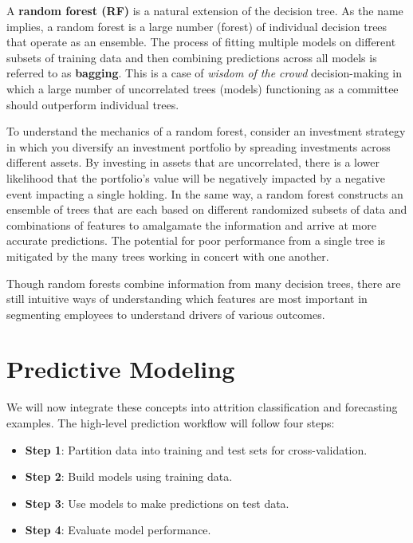 \documentclass[
]{book}
\providecommand{\tightlist}{%
  \setlength{\itemsep}{0pt}\setlength{\parskip}{0pt}}
\begin{document}
A \textbf{random forest (RF)} is a natural extension of the decision tree. As the name implies, a random forest is a large number (forest) of individual decision trees that operate as an ensemble. The process of fitting multiple models on different subsets of training data and then combining predictions across all models is referred to as \textbf{bagging}. This is a case of \emph{wisdom of the crowd} decision-making in which a large number of uncorrelated trees (models) functioning as a committee should outperform individual trees.

To understand the mechanics of a random forest, consider an investment strategy in which you diversify an investment portfolio by spreading investments across different assets. By investing in assets that are uncorrelated, there is a lower likelihood that the portfolio's value will be negatively impacted by a negative event impacting a single holding. In the same way, a random forest constructs an ensemble of trees that are each based on different randomized subsets of data and combinations of features to amalgamate the information and arrive at more accurate predictions. The potential for poor performance from a single tree is mitigated by the many trees working in concert with one another.

Though random forests combine information from many decision trees, there are still intuitive ways of understanding which features are most important in segmenting employees to understand drivers of various outcomes.

\hypertarget{predictive-modeling}{%
\section{Predictive Modeling}\label{predictive-modeling}}

We will now integrate these concepts into attrition classification and forecasting examples. The high-level prediction workflow will follow four steps:

\begin{itemize}
\tightlist
\item
  \textbf{Step 1}: Partition data into training and test sets for cross-validation.
\item
  \textbf{Step 2}: Build models using training data.
\item
  \textbf{Step 3}: Use models to make predictions on test data.
\item
  \textbf{Step 4}: Evaluate model performance.
\end{itemize}
\end{document}
